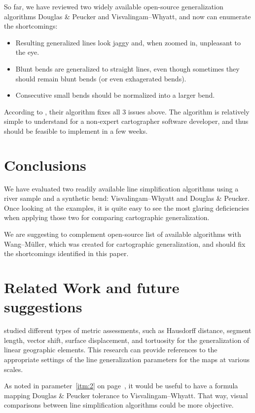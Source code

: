 \documentclass[a4paper]{article}
\newcommand{\DP}{Douglas \& Peucker}
\newcommand{\VW}{Visvalingam--Whyatt}
\newcommand{\WM}{Wang--M{\"u}ller}
\begin{document}
So far, we have reviewed two widely available open-source generalization
algorithms {\DP} and {\VW}, and now can enumerate the shortcomings:
\begin{itemize}
    \item Resulting generalized lines look jaggy and, when zoomed in,
        unpleasant to the eye.
    \item Blunt bends are generalized to straight lines, even though sometimes
        they should remain blunt bends (or even exhagerated bends).
    \item Consecutive small bends should be normalized into a larger bend.
\end{itemize}

According to \cite{wang1998line}, their algorithm fixes all 3 issues above. The
algorithm is relatively simple to understand for a non-expert cartographer
software developer, and thus should be feasible to implement in a few weeks.

\section{Conclusions}
\label{sec:conclusions}

We have evaluated two readily available line simplification algorithms using a
river sample and a synthetic bend: {\VW} and {\DP}. Once looking at the
examples, it is quite easy to see the most glaring deficiencies when applying
those two for comparing cartographic generalization.

We are suggesting to complement open-source list of
available algorithms with {\WM}, which was created for cartographic
generalization, and should fix the shortcomings identified in this paper.

\section{Related Work and future suggestions}
\label{sec:related_work}

\cite{stanislawski2012automated} studied different types of metric assessments,
such as Hausdorff distance, segment length, vector shift, surface displacement,
and tortuosity for the generalization of linear geographic elements. This
research can provide references to the appropriate settings of the line
generalization parameters for the maps at various scales.

As noted in parameter~\ref{itm:2} on page~\pageref{itm:2}, it would be useful
to have a formula mapping {\DP} tolerance to {\VW}. That way, visual
comparisons between line simplification algorithms could be more objective.
\end{document}
